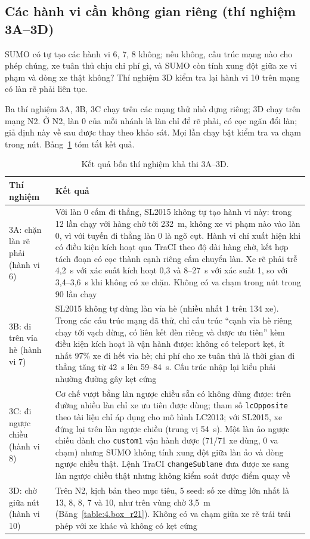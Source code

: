 \documentclass[../main.tex]{subfiles}
\begin{document}
\subsection{Các hành vi cần không gian riêng (thí nghiệm 3A--3D)}
\label{subsection:phase3}

SUMO có tự tạo các hành vi 6, 7, 8 không; nếu không, cấu trúc mạng nào cho phép chúng, xe tuân thủ chịu chi phí gì, và SUMO còn tính xung đột giữa xe vi phạm và dòng xe thật không? Thí nghiệm 3D kiểm tra lại hành vi 10 trên mạng có làn rẽ phải liên tục.

Ba thí nghiệm 3A, 3B, 3C chạy trên các mạng thử nhỏ dựng riêng; 3D chạy trên mạng N2. Ở N2, làn 0 của mỗi nhánh là làn chỉ để rẽ phải, có cọc ngăn đổi làn; giả định này về sau được thay theo khảo sát. Mọi lần chạy bật kiểm tra va chạm trong nút. Bảng~\ref{table:4.phase3} tóm tắt kết quả.

\begin{table}[!htbp]
\centering
\small
\caption{Kết quả bốn thí nghiệm khả thi 3A--3D.} \label{table:4.phase3}
\begin{tabular}{|>{\raggedright\arraybackslash}p{2.4cm}|>{\raggedright\arraybackslash}p{11.6cm}|}
\hline
\textbf{Thí nghiệm} & \textbf{Kết quả} \\ \hline
3A: chặn làn rẽ phải (hành vi 6) & Với làn 0 cấm đi thẳng, SL2015 không tự tạo hành vi này: trong 12 lần chạy với hàng chờ tới 232~m, không xe vi phạm nào vào làn 0, vì với tuyến đi thẳng làn 0 là ngõ cụt. Hành vi chỉ xuất hiện khi có điều kiện kích hoạt qua TraCI theo độ dài hàng chờ, kết hợp tách đoạn có cọc thành cạnh riêng cấm chuyển làn. Xe rẽ phải trễ 4,2~s với xác suất kích hoạt 0,3 và 8--27~s với xác suất 1, so với 3,4--3,6~s khi không có xe chặn. Không có va chạm trong nút trong 90 lần chạy \\ \hline
3B: đi trên vỉa hè (hành vi 7) & SL2015 không tự dùng làn vỉa hè (nhiều nhất 1 trên 134 xe). Trong các cấu trúc mạng đã thử, chỉ cấu trúc ``cạnh vỉa hè riêng chạy tới vạch dừng, có liên kết đèn riêng và được ưu tiên'' kèm điều kiện kích hoạt là vận hành được: không có teleport kẹt, ít nhất 97\% xe đi hết vỉa hè; chi phí cho xe tuân thủ là thời gian đi thẳng tăng từ 42~s lên 59--84~s. Cấu trúc nhập lại kiểu phải nhường đường gây kẹt cứng \\ \hline
3C: đi ngược chiều (hành vi 8) & Cơ chế vượt bằng làn ngược chiều sẵn có không dùng được: trên đường nhiều làn chỉ xe ưu tiên được dùng; tham số \texttt{lcOpposite} theo tài liệu chỉ áp dụng cho mô hình LC2013; với SL2015, xe đứng lại trên làn ngược chiều (trung vị 54~s). Một làn ảo ngược chiều dành cho \texttt{custom1} vận hành được (71/71 xe dùng, 0 va chạm) nhưng SUMO không tính xung đột giữa làn ảo và dòng ngược chiều thật. Lệnh TraCI \texttt{changeSublane} đưa được xe sang làn ngược chiều thật nhưng không kiểm soát được điểm quay về \\ \hline
3D: chờ giữa nút (hành vi 10) & Trên N2, kịch bản theo mục tiêu, 5 seed: số xe dừng lớn nhất là 13, 8, 8, 7 và 10, như trên vùng chờ 3,5~m (Bảng~\ref{table:4.box_r21}). Không có va chạm giữa xe rẽ trái trái phép với xe khác và không có kẹt cứng \\ \hline
\end{tabular}
\end{table}
\end{document}
